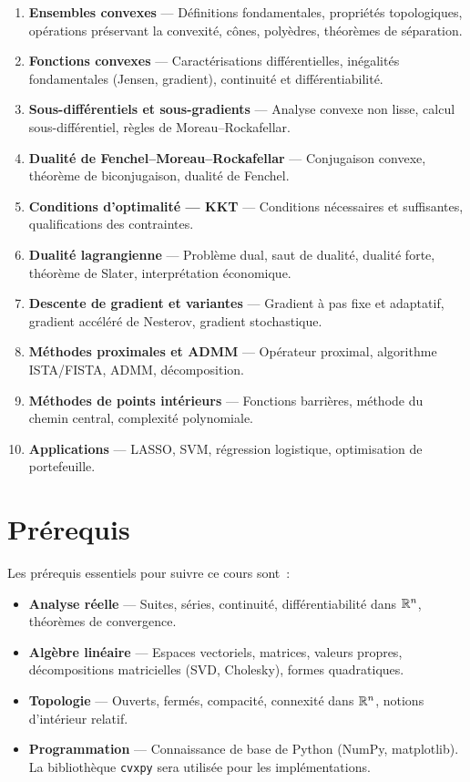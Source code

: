 \begin{enumerate}
    \item \textbf{Ensembles convexes} --- D\'efinitions fondamentales, propri\'et\'es
          topologiques, op\'erations pr\'eservant la convexit\'e, c\^ones, poly\`edres,
          th\'eor\`emes de s\'eparation.
    \item \textbf{Fonctions convexes} --- Caract\'erisations diff\'erentielles,
          in\'egalit\'es fondamentales (Jensen, gradient), continuit\'e et diff\'erentiabilit\'e.
    \item \textbf{Sous-diff\'erentiels et sous-gradients} --- Analyse convexe non lisse,
          calcul sous-diff\'erentiel, r\`egles de Moreau--Rockafellar.
    \item \textbf{Dualit\'e de Fenchel--Moreau--Rockafellar} --- Conjugaison convexe,
          th\'eor\`eme de biconjugaison, dualit\'e de Fenchel.
    \item \textbf{Conditions d'optimalit\'e --- KKT} --- Conditions n\'ecessaires et
          suffisantes, qualifications des contraintes.
    \item \textbf{Dualit\'e lagrangienne} --- Probl\`eme dual, saut de dualit\'e,
          dualit\'e forte, th\'eor\`eme de Slater, interpr\'etation \'economique.
    \item \textbf{Descente de gradient et variantes} --- Gradient \`a pas fixe et
          adaptatif, gradient acc\'el\'er\'e de Nesterov, gradient stochastique.
    \item \textbf{M\'ethodes proximales et ADMM} --- Op\'erateur proximal,
          algorithme ISTA/FISTA, ADMM, d\'ecomposition.
    \item \textbf{M\'ethodes de points int\'erieurs} --- Fonctions barri\`eres,
          m\'ethode du chemin central, complexit\'e polynomiale.
    \item \textbf{Applications} --- LASSO, SVM, r\'egression logistique,
          optimisation de portefeuille.
\end{enumerate}

\section*{Pr\'erequis}

Les pr\'erequis essentiels pour suivre ce cours sont~:

\begin{itemize}
    \item \textbf{Analyse r\'eelle} --- Suites, s\'eries, continuit\'e, diff\'erentiabilit\'e
          dans $\mathbb{R}^n$, th\'eor\`emes de convergence.
    \item \textbf{Alg\`ebre lin\'eaire} --- Espaces vectoriels, matrices, valeurs propres,
          d\'ecompositions matricielles (SVD, Cholesky), formes quadratiques.
    \item \textbf{Topologie} --- Ouverts, ferm\'es, compacit\'e, connexit\'e dans $\mathbb{R}^n$,
          notions d'int\'erieur relatif.
    \item \textbf{Programmation} --- Connaissance de base de Python (NumPy, matplotlib).
          La biblioth\`eque \texttt{cvxpy} sera utilis\'ee pour les impl\'ementations.
\end{itemize}

